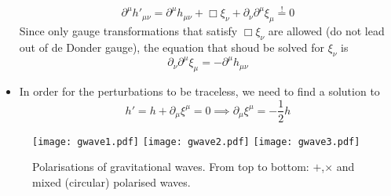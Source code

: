 \begin{itemize}
\begin{equation}
        \partial^\mu h'_{\mu\nu} = \partial^\mu h_{\mu\nu} + \Box \xi_\nu + \partial_\nu \partial^\mu \xi_\mu \overset{!}{=} 0
    \end{equation}
    Since only gauge transformations that satisfy $\Box \xi_\nu$ are allowed (do not lead out of de Donder gauge), the equation that shoud
    be solved for $\xi_\nu$ is
    \begin{equation}
        \partial_\nu \partial^\mu \xi_\mu = - \partial^\mu h_{\mu\nu}
    \end{equation}
    \item In order for the perturbations to be traceless, we need to find a solution to
    \begin{equation}
        h' = h + \partial_\mu \xi^\mu = 0 \implies \partial_\mu \xi^\mu =
        -\frac{1}{2}h
    \end{equation}
\end{itemize}
\begin{figure}[hbtp!]
\centering
 \texttt{[image: gwave1.pdf]}
  \texttt{[image: gwave2.pdf]}
  \texttt{[image: gwave3.pdf]}
\caption{Polarisations of gravitational waves. From top to bottom:
$+$,$\times$ and mixed (circular) polarised waves.}
\end{figure}

